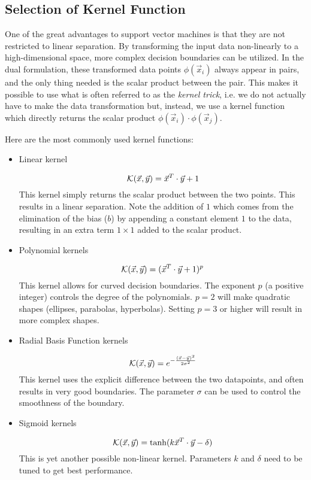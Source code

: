 \documentclass{article}
\begin{document}
\subsection{Selection of Kernel Function}
\label{sec:kernel}

One of the great advantages to support vector machines is that they
are not restricted to linear separation.  By transforming the input
data non-linearly to a high-dimensional space, more complex decision
boundaries can be utilized.  In the dual formulation, these
transformed data points \(\phi(\vec{x}_i)\) always appear in pairs,
and the only thing needed is the scalar product between the pair.
This makes it possible to use what is often referred to as the
\emph{kernel trick}, i.e. we do not actually have to make the data
transformation but, instead, we use a kernel function which directly
returns the scalar product \(\phi(\vec{x}_i)\cdot\phi(\vec{x}_j)\).

Here are the most commonly used kernel functions:
\begin{itemize}
\item Linear kernel

  \[{\cal K}(\vec{x}, \vec{y}) = \vec{x}^T\cdot\vec{y} + 1\] This
  kernel simply returns the scalar product between the two points.
  This results in a linear separation.  Note the addition of \(1\)
  which comes from the elimination of the bias (\(b\)) by appending a
  constant element \(1\) to the data, resulting in an extra term
  \(1\times1\) added to the scalar product.

\item Polynomial kernels

  \[{\cal K}(\vec{x}, \vec{y}) = (\vec{x}^T\cdot\vec{y} + 1)^p\] This
  kernel allows for curved decision boundaries.  The exponent \(p\) (a
  positive integer) controls the degree of the polynomials.  \(p=2\)
  will make quadratic shapes (ellipses, parabolas, hyperbolas).
  Setting \(p=3\) or higher will result in more complex shapes.

\item Radial Basis Function kernels

  \[{\cal K}(\vec{x}, \vec{y}) =
  e^{-\frac{(\vec{x}-\vec{y})^2}{2\sigma^2}}\] This kernel uses the
  explicit difference between the two datapoints, and often results in
  very good boundaries.  The parameter \(\sigma\) can be used to
  control the smoothness of the boundary.

\item Sigmoid kernels

  \[{\cal K}(\vec{x}, \vec{y}) = \tanh(k \vec{x}^T\cdot\vec{y} -
  \delta)\] This is yet another possible non-linear kernel.
  Parameters \(k\) and \(\delta\) need to be tuned to get best
  performance.

\end{itemize}
\end{document}
